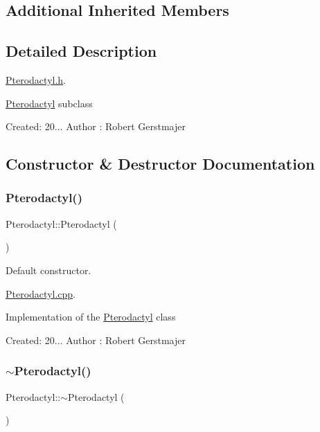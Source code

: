 \subsection*{Additional Inherited Members}


\subsection{Detailed Description}
\mbox{\hyperlink{_pterodactyl_8h}{Pterodactyl.\+h}}. 

\mbox{\hyperlink{class_pterodactyl}{Pterodactyl}} subclass

Created\+: 20... Author \+: Robert Gerstmajer 

\subsection{Constructor \& Destructor Documentation}
\mbox{\label{class_pterodactyl_ae667ed30c8198eae8027bf34b2f90034}} 
\subsubsection{\texorpdfstring{Pterodactyl()}{Pterodactyl()}}
{\footnotesize\ttfamily Pterodactyl\+::\+Pterodactyl (\begin{DoxyParamCaption}{ }\end{DoxyParamCaption})}



Default constructor. 

\mbox{\hyperlink{_pterodactyl_8cpp}{Pterodactyl.\+cpp}}.

Implementation of the \mbox{\hyperlink{class_pterodactyl}{Pterodactyl}} class

Created\+: 20... Author \+: Robert Gerstmajer \mbox{\label{class_pterodactyl_a57c101dcc34661693bb424770d590c0a}} 
\subsubsection{\texorpdfstring{$\sim$\+Pterodactyl()}{~Pterodactyl()}}
{\footnotesize\ttfamily Pterodactyl\+::$\sim$\+Pterodactyl (\begin{DoxyParamCaption}{ }\end{DoxyParamCaption})}



